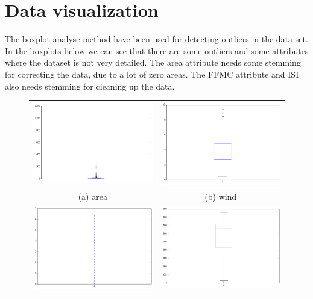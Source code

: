 \section{Data visualization}

The boxplot analyse method have been used for detecting outliers in the data set. In the boxplots below we can see that there are some outliers and some attributes where the dataset is not very detailed. The area attribute needs some stemming for correcting the data, due to a lot of zero areas. The FFMC attribute and ISI also needs stemming for cleaning up the data.

\begin{figure}
\begin{tabular}{cc}
  \includegraphics[width=65mm]{images/boxplots/area.png} &   \includegraphics[width=65mm]{images/boxplots/wind.png} \\
(a) area & (b) wind \\[6pt]
 \includegraphics[width=65mm]{images/boxplots/rain.png} &   \includegraphics[width=65mm]{images/boxplots/DC.png} \\

\end{tabular}
\end{figure}
